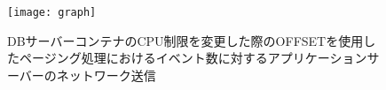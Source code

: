 \documentclass[../../../../../main]{subfiles}
\begin{document}
    \begin{figure}[H]
        \centering
        \texttt{[image: graph]}
        \caption{DBサーバーコンテナのCPU制限を変更した際のOFFSETを使用したページング処理におけるイベント数に対するアプリケーションサーバーのネットワーク送信}
        \label{fig:paging-offset-change-db-cpu-limit-app-net-out-app_4_8192-db_1024}
    \end{figure}
\end{document}
